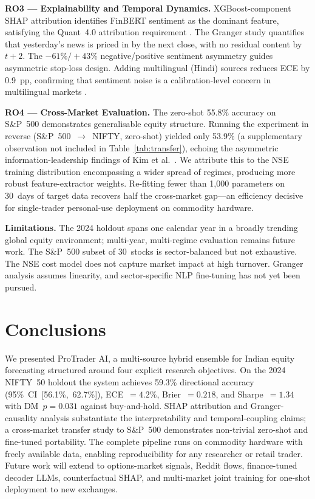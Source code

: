 \documentclass[12pt,a4paper]{article}
\begin{document}
\textbf{RO3 --- Explainability and Temporal Dynamics.} XGBoost-component SHAP
attribution identifies FinBERT sentiment as the dominant feature,
satisfying the Quant~4.0 attribution requirement \cite{r9}. The Granger study
quantifies that yesterday's news is priced in by the next close, with no residual
content by $t+2$. The $-61\%/+43\%$ negative/positive sentiment asymmetry guides
asymmetric stop-loss design. Adding multilingual (Hindi) sources reduces ECE by 0.9~pp,
confirming that sentiment noise is a calibration-level concern in multilingual
markets \cite{r22}.

\textbf{RO4 --- Cross-Market Evaluation.} The zero-shot 55.8\% accuracy on
S\&P~500 demonstrates generalisable equity structure. Running the experiment
in reverse (S\&P~500~$\to$~NIFTY, zero-shot) yielded only 53.9\%
(a supplementary observation not included in Table~\ref{tab:transfer}),
echoing the asymmetric information-leadership findings of Kim et al.\ \cite{r11}. We
attribute this to the NSE training distribution encompassing a wider spread of
regimes, producing more robust feature-extractor weights. Re-fitting fewer than 1{,}000 parameters on
30~days of target data recovers half the cross-market gap---an efficiency
decisive for single-trader personal-use deployment on commodity hardware.

\textbf{Limitations.} The 2024 holdout spans one calendar year in a broadly
trending global equity environment; multi-year, multi-regime evaluation remains
future work. The S\&P~500 subset of 30~stocks is sector-balanced but not
exhaustive. The NSE cost model does not capture market impact at high turnover.
Granger analysis assumes linearity, and sector-specific NLP fine-tuning has not yet been pursued.

\section{Conclusions}

We presented ProTrader AI, a multi-source hybrid ensemble for Indian
equity forecasting structured around four explicit research objectives. On the
2024 NIFTY~50 holdout the system achieves 59.3\% directional accuracy
(95\%~CI~[56.1\%,~62.7\%]), ECE~$=4.2\%$, Brier~$=0.218$, and Sharpe~$=1.34$
with DM~$p=0.031$ against buy-and-hold. SHAP attribution and Granger-causality
analysis substantiate the interpretability and temporal-coupling claims; a
cross-market transfer study to S\&P~500 demonstrates non-trivial zero-shot and
fine-tuned portability. The complete pipeline runs on commodity hardware with
freely available data, enabling reproducibility for any researcher or retail
trader. Future work will extend to options-market signals, Reddit flows, finance-tuned
decoder LLMs, counterfactual SHAP, and multi-market joint training for
one-shot deployment to new exchanges.
\end{document}
